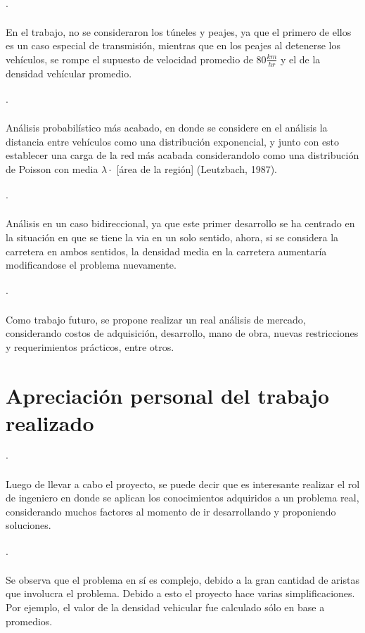 \documentclass[12pt]{article}
\begin{document}
\paragraph{$\cdot$}En el trabajo, no se consideraron los túneles y peajes, ya que el primero de ellos es 
un caso especial de transmisión, mientras que en los peajes al detenerse los vehículos, se rompe el 
supuesto de velocidad promedio de $80 \frac{km}{hr}$ y el de la densidad vehícular promedio.
\paragraph{$\cdot$}Análisis probabilístico más acabado, en donde se considere en el análisis la distancia 
entre vehículos como una distribución exponencial, y junto con esto establecer una carga de la red más 
acabada considerandolo como una distribución de Poisson con media $\lambda \cdot$ [área de la región] 
(Leutzbach, 1987).
\paragraph{$\cdot$}Análisis en un caso bidireccional, ya que este primer desarrollo se ha centrado en 
la situación en que se tiene la via en un solo sentido, ahora, si se considera la carretera en ambos
sentidos, la densidad media en la carretera aumentaría modificandose el problema nuevamente.
\paragraph{$\cdot$}Como trabajo futuro, se propone realizar un real análisis de mercado, considerando
costos de adquisición, desarrollo, mano de obra, nuevas restricciones y requerimientos prácticos, entre 
otros.


\newpage
\section{Apreciación personal del trabajo realizado}
\paragraph{$\cdot$}
Luego de llevar a cabo el proyecto, se puede decir que es interesante realizar el rol de ingeniero en 
donde se aplican los conocimientos adquiridos a un problema real, considerando muchos factores al 
momento de ir desarrollando y proponiendo soluciones.
\paragraph{$\cdot$}Se observa que el problema en sí es complejo, debido a la gran cantidad de aristas que 
involucra el problema. Debido a esto el proyecto hace varias simplificaciones. Por ejemplo, el valor de 
la densidad vehicular fue calculado sólo en base a promedios.
\end{document}

